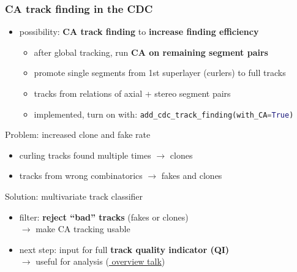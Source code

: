 \documentclass[18pt, aspectratio=169]{beamer}
\newcommand{\greenbold}[1]{\textcolor{kit-green100}{\bf{#1}}}
\newcommand{\orangebold}[1]{\textcolor{kit-orange100}{\bf{#1}}}
\begin{document}
\begin{frame}
  \frametitle{CA track finding in the CDC}
  \begin{itemize}
  \item possibility: \greenbold{CA track finding} to \orangebold{increase finding efficiency}
    \begin{itemize}
    \item after global tracking, run \greenbold{CA on remaining segment pairs}
    \item promote single segments from 1st superlayer (curlers) to full tracks
    \item tracks from relations of axial + stereo segment pairs
    \item implemented, turn on with: \lstinline[language=python, frame=single]{add_cdc_track_finding(with_CA=True)}            
    \end{itemize}
    
  \end{itemize}
  \pause
  \begin{alertblock}{Problem: increased clone and fake rate}
    \begin{itemize}
    \item curling tracks found multiple times $\rightarrow$ clones
    \item tracks from wrong combinatorics $\rightarrow$ fakes and clones
    \end{itemize}
  \end{alertblock}

  \begin{block}{Solution: multivariate track classifier}
    \begin{itemize}
    \item filter: \textbf{reject ``bad'' tracks} (fakes or clones)\\
      $\rightarrow$ make CA tracking usable
    \item next step: input for full \textbf{track quality indicator (QI)}\\
    $\rightarrow$ useful for analysis
    (\href{https://kds.kek.jp/indico/event/26522/session/10/contribution/75/material/slides/0.pdf}{
      overview talk})
  \end{itemize}
\end{block}
\end{frame}
\end{document}
